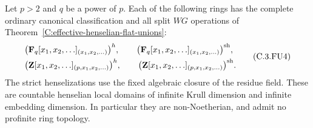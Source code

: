 \begin{corollary}
\label{C:infinite-variable-henselian-WG}
Let $p>2$ and $q$ be a power of $p$.
Each of the following rings has the complete ordinary
canonical classification and all split $WG$ operations
of Theorem~\ref{C:effective-henselian-flat-unions}:
\[
 \begin{split}
 &\bigl(\mathbf F_q[x_1,x_2,\ldots]_{(x_1,x_2,\ldots)}\bigr)^h,
 \qquad
 \bigl(\mathbf F_q[x_1,x_2,\ldots]_{(x_1,x_2,\ldots)}\bigr)^{\rm sh},\\
 &\bigl(\mathbf Z[x_1,x_2,\ldots]_{(p,x_1,x_2,\ldots)}\bigr)^h,
 \qquad
 \bigl(\mathbf Z[x_1,x_2,\ldots]_{(p,x_1,x_2,\ldots)}\bigr)^{\rm sh}.
 \end{split}                                             \tag{C.3.FU4}
\]
The strict henselizations use the fixed algebraic
closure of the residue field.
These are countable henselian local domains of
infinite Krull dimension and infinite embedding
dimension.  In particular they are non-Noetherian,
and admit no profinite ring topology.
\end{corollary}
